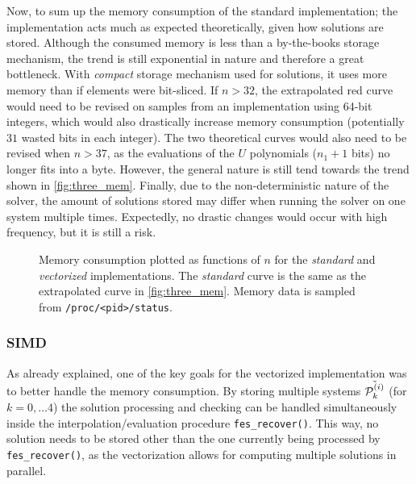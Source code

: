 Now, to sum up the memory consumption of the standard implementation; the implementation acts much as expected theoretically, given how solutions are stored. Although the consumed memory is less than a by-the-books storage mechanism, the trend is still exponential in nature and therefore a great bottleneck. With \textit{compact} storage mechanism used for solutions, it uses more memory than if elements were bit-sliced. If $n > 32$, the extrapolated red curve would need to be revised on samples from an implementation using 64-bit integers, which would also drastically increase memory consumption (potentially $31$ wasted bits in each integer). The two theoretical curves would also need to be revised when $n > 37$, as the evaluations of the $U$ polynomials ($n_1 + 1$ bits) no longer fits into a byte. However, the general nature is still tend towards the trend shown in \cref{fig:three_mem}. Finally, due to the non-deterministic nature of the solver, the amount of solutions stored may differ when running the solver on one system multiple times. Expectedly, no drastic changes would occur with high frequency, but it is still a risk.

\begin{figure}[t]
    \centering
    \caption{Memory consumption plotted as functions of $n$ for the \textit{standard} and \textit{vectorized} implementations. The \textit{standard} curve is the same as the extrapolated curve in \cref{fig:three_mem}. Memory data is sampled from \texttt{/proc/<pid>/status}.} \label{fig:avx_simd_mem}
\end{figure}

\subsubsection{SIMD}
As already explained, one of the key goals for the vectorized implementation was to better handle the memory consumption. By storing multiple systems $\Tilde{\mathcal{P}^{(i)}_k}$ (for $k = 0, \dots 4$) the solution processing and checking can be handled simultaneously inside the interpolation/evaluation procedure \texttt{fes\_recover()}. This way, no solution needs to be stored other than the one currently being processed by \texttt{fes\_recover()}, as the vectorization allows for computing multiple solutions in parallel.

